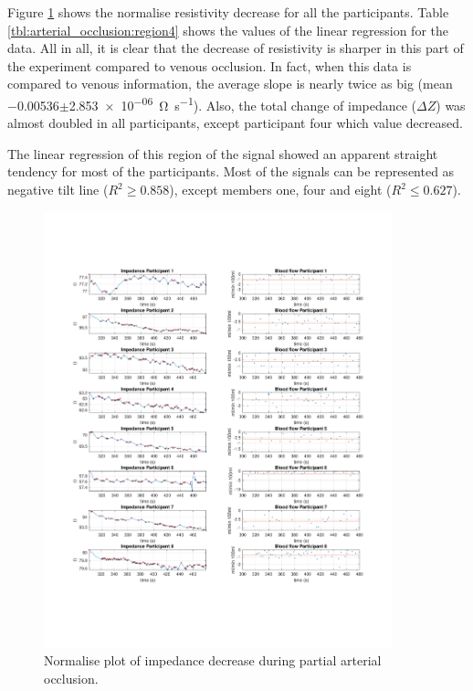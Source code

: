 Figure \ref{fig:normalise:arterial_occlusion} shows the normalise resistivity decrease for all the participants. Table \ref{tbl:arterial_occlusion:region4} shows the values of the linear regression for the data.   All in all, it is clear that the decrease of resistivity is sharper in this part of the experiment compared to venous occlusion.  In fact, when this data is compared to venous information, the average slope is nearly twice as big (mean \num{-0.00536}$\pm$\SI{2.853e-06}{\ohm\per\second}). Also, the total change of impedance ($\Delta Z$) was almost doubled in all participants, except participant four which value decreased.  

The linear regression of this region of the signal showed an apparent straight tendency for most of the participants. Most of the signals can be represented as negative tilt line ($R^2 \geq 0.858 $), except members one, four and eight ($R^2 \leq 0.627 $).

\begin{figure}
	\centering
	\includegraphics[width=0.9\textwidth,height=0.9\textheight,keepaspectratio]{figure4}    
	\caption{Normalise plot of impedance decrease during partial arterial occlusion.}
	\label{fig:normalise:arterial_occlusion}
\end{figure}

